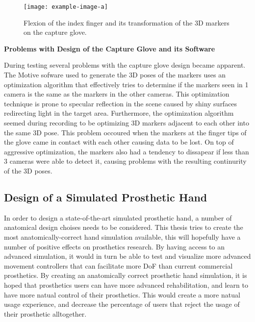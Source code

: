\documentclass[../main.tex]{subfiles}
\begin{document}
\begin{center}
\begin{figure}[h]
\texttt{[image: example-image-a]}
\caption{Flexion of the index finger and its transformation of the 3D markers on the capture glove.}
\label{fig:glove_flex}
\end{figure}
\end{center}

\textbf{Problems with Design of the Capture Glove and its Software}

During testing several problems with the capture glove design became apparent.
The Motive sofware used to generate the 3D poses of the markers uses an optimization algorithm that effectively tries to determine if the markers seen in 1 camera is the same as the markers in the other cameras.
This optimization technique is prone to specular reflection in the scene caused by shiny surfaces redirecting light in the target area.
Furthermore, the optimization algorithm seemed during recording to be optimizing 3D markers adjacent to each other into the same 3D pose.
This problem occoured when the markers at the finger tips of the glove came in contact with each other causing data to be lost.
On top of aggressive optimization, the markers also had a tendency to dissapear if less than 3 cameras were able to detect it, causing problems with the resulting continurity of the 3D poses. 


\subsection{Design of a Simulated Prosthetic Hand}
\label{sec:prost_sim}

In order to design a state-of-the-art simulated prosthetic hand, a number of anatomical design choises needs to be considered.
This thesis tries to create the most anatomically-correct hand simulation available, this will hopefully have a number of positive effects on prosthetics research.
By having access to an advanced simulation, it would in turn be able to test and visualize more advanced movement controllers that can facilitate more DoF than current commercial prosthetics. 
By creating an anatomically correct prosthetic hand simulation, it is hoped that prosthetics users can have more advanced rehabilitation, and learn to have more natual control of their prosthetics. This would create a more natual usage experience, and decrease the percentage of users that reject the usage of their prosthetic alltogether.
\end{document}
